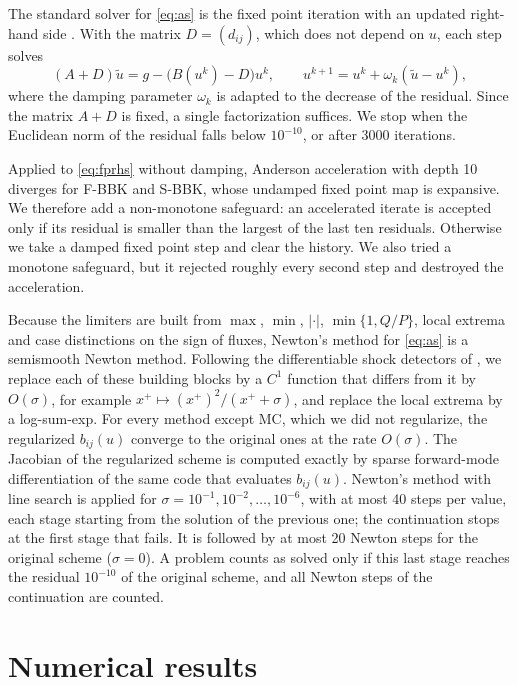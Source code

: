 \documentclass[11pt,a4paper]{article}
\theoremstyle{remark}
\begin{document}
The standard solver for \eqref{eq:as} is the fixed point iteration with an updated right-hand side
\cite{BJK16,JJ19}. With the matrix $D=(d_{ij})$, which does not depend on $u$, each step solves
\begin{equation}\label{eq:fprhs}
  (A+D)\tilde u=g-\bigl(B(u^k)-D\bigr)u^k,\qquad u^{k+1}=u^k+\omega_k(\tilde u-u^k),
\end{equation}
where the damping parameter $\omega_k$ is adapted to the decrease of the residual. Since the matrix $A+D$ is fixed,
a single factorization suffices. We stop when the Euclidean norm of the residual falls below $10^{-10}$, or after
3000 iterations.

Applied to \eqref{eq:fprhs} without damping, Anderson acceleration with depth 10 \cite{WN11} diverges for F-BBK and
S-BBK, whose undamped fixed point map is expansive. We therefore add a non-monotone safeguard: an accelerated iterate
is accepted only if its residual is smaller than the largest of the last ten residuals. Otherwise we take a damped
fixed point step and clear the history. We also tried a monotone safeguard, but it rejected roughly every second step
and destroyed the acceleration.

Because the limiters are built from $\max$, $\min$, $|\cdot|$, $\min\{1,Q/P\}$, local extrema and case distinctions
on the sign of fluxes, Newton's method for \eqref{eq:as} is a semismooth Newton method. Following the differentiable
shock detectors of \cite{BB17}, we replace each of these building blocks by a $C^1$ function that differs from it by
$O(\sigma)$, for example $x^+\mapsto(x^+)^2/(x^++\sigma)$, and replace the local extrema by a log-sum-exp. For every
method except MC, which we did not regularize, the regularized $b_{ij}(u)$ converge to the original ones at the rate
$O(\sigma)$. The Jacobian of the regularized scheme is computed exactly by sparse forward-mode differentiation of the same
code that evaluates $b_{ij}(u)$. Newton's method with line search is applied for
$\sigma=10^{-1},10^{-2},\dots,10^{-6}$, with at most 40 steps per value, each stage starting from the solution of
the previous one; the continuation stops at the first stage that fails. It is followed by at most 20 Newton steps for
the original scheme ($\sigma=0$). A problem counts as solved only if this last stage reaches the residual $10^{-10}$
of the original scheme, and all Newton steps of the continuation are counted.

\section{Numerical results}\label{sec:num}
\end{document}
